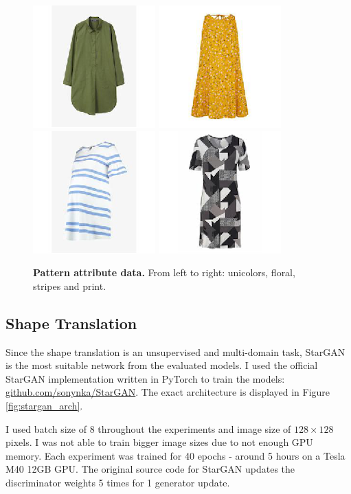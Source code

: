 \documentclass[12pt]{report}
\begin{document}
\begin{figure}[!h]
{\includegraphics[width=.2\linewidth]{03_analysis/data/pattern_unicolors}}
{\includegraphics[width=.2\linewidth]{03_analysis/data/pattern_floral}}
{\includegraphics[width=.2\linewidth]{03_analysis/data/pattern_stripes}}
{\includegraphics[width=.2\linewidth]{03_analysis/data/pattern_print}}
\caption{\label{fig:pattern_data} \textbf{Pattern attribute data.} From left to right: unicolors, floral, stripes and print.}
\end{figure}

\pagebreak
\subsection{Shape Translation}
Since the shape translation is an unsupervised and multi-domain task, StarGAN is the most suitable network from the evaluated models. I used the official StarGAN implementation written in PyTorch to train the models: \linebreak \hyperlink{https://github.com/sonynka/StarGAN}{github.com/sonynka/StarGAN}. The exact architecture is displayed in Figure \ref{fig:stargan_arch}.

I used batch size of 8 throughout the experiments and image size of $128 \times 128$ pixels. I was not able to train bigger image sizes due to not enough GPU memory. Each experiment was trained for 40 epochs - around 5 hours on a Tesla M40 12GB GPU. The original source code for StarGAN updates the discriminator weights 5 times for 1 generator update. 
\end{document}
